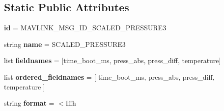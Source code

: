 \subsection*{Static Public Attributes}
\begin{DoxyCompactItemize}
\item 
\mbox{\label{classpymavlink_1_1dialects_1_1v10_1_1MAVLink__scaled__pressure3__message_a9d33e930c481fa9d16f34cfdc6f37590}} 
{\bfseries id} = M\+A\+V\+L\+I\+N\+K\+\_\+\+M\+S\+G\+\_\+\+I\+D\+\_\+\+S\+C\+A\+L\+E\+D\+\_\+\+P\+R\+E\+S\+S\+U\+R\+E3
\item 
\mbox{\label{classpymavlink_1_1dialects_1_1v10_1_1MAVLink__scaled__pressure3__message_a0c40e6aa73d928a174173c5986409a79}} 
string {\bfseries name} = \textquotesingle{}S\+C\+A\+L\+E\+D\+\_\+\+P\+R\+E\+S\+S\+U\+R\+E3\textquotesingle{}
\item 
\mbox{\label{classpymavlink_1_1dialects_1_1v10_1_1MAVLink__scaled__pressure3__message_aea45fa992c1df8c5ecd9c697fe723242}} 
list {\bfseries fieldnames} = \mbox{[}\textquotesingle{}time\+\_\+boot\+\_\+ms\textquotesingle{}, \textquotesingle{}press\+\_\+abs\textquotesingle{}, \textquotesingle{}press\+\_\+diff\textquotesingle{}, \textquotesingle{}temperature\textquotesingle{}\mbox{]}
\item 
\mbox{\label{classpymavlink_1_1dialects_1_1v10_1_1MAVLink__scaled__pressure3__message_a2a4b063b7545d825feab0c7b2c723b0f}} 
list {\bfseries ordered\+\_\+fieldnames} = \mbox{[} \textquotesingle{}time\+\_\+boot\+\_\+ms\textquotesingle{}, \textquotesingle{}press\+\_\+abs\textquotesingle{}, \textquotesingle{}press\+\_\+diff\textquotesingle{}, \textquotesingle{}temperature\textquotesingle{} \mbox{]}
\item 
\mbox{\label{classpymavlink_1_1dialects_1_1v10_1_1MAVLink__scaled__pressure3__message_a372a504c4071c13751c1f42959af350c}} 
string {\bfseries format} = \textquotesingle{}$<$Iffh\textquotesingle{}
\item 
\mbox{\label{classpymavlink_1_1dialects_1_1v10_1_1MAVLink__scaled__pressure3__message_af2560b093e3f4552025d8eda0e996b13}} 

\end{DoxyCompactItemize}
